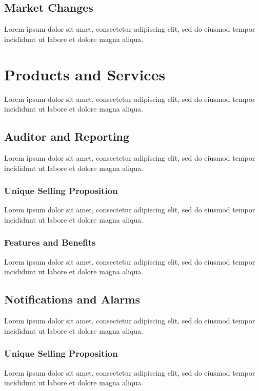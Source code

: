 \subsection{Market Changes}
Lorem ipsum dolor sit amet, consectetur adipiscing elit, sed do eiusmod tempor incididunt ut labore et dolore magna aliqua.


\section{Products and Services}
Lorem ipsum dolor sit amet, consectetur adipiscing elit, sed do eiusmod tempor incididunt ut labore et dolore magna aliqua.


\subsection{Auditor and Reporting}
Lorem ipsum dolor sit amet, consectetur adipiscing elit, sed do eiusmod tempor incididunt ut labore et dolore magna aliqua.

\subsubsection*{Unique Selling Proposition}
Lorem ipsum dolor sit amet, consectetur adipiscing elit, sed do eiusmod tempor incididunt ut labore et dolore magna aliqua.

\subsubsection*{Features and Benefits}
Lorem ipsum dolor sit amet, consectetur adipiscing elit, sed do eiusmod tempor incididunt ut labore et dolore magna aliqua.


\subsection{Notifications and Alarms}
Lorem ipsum dolor sit amet, consectetur adipiscing elit, sed do eiusmod tempor incididunt ut labore et dolore magna aliqua.

\subsubsection*{Unique Selling Proposition}
Lorem ipsum dolor sit amet, consectetur adipiscing elit, sed do eiusmod tempor incididunt ut labore et dolore magna aliqua.

